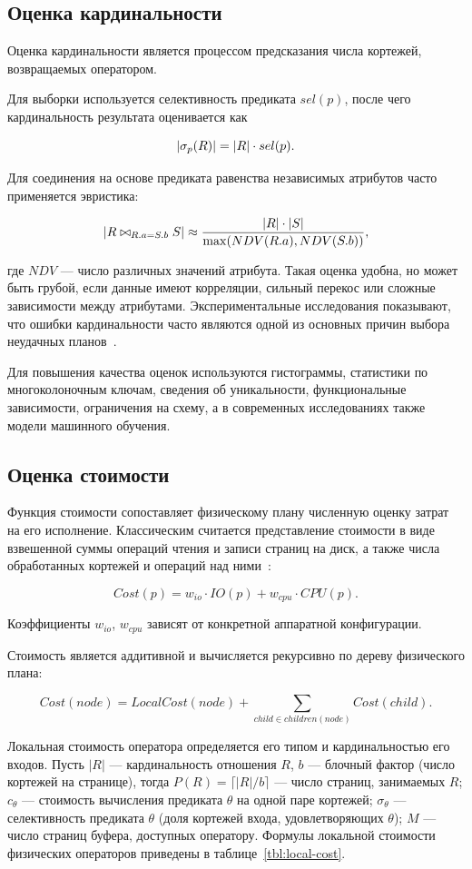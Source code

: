 \documentclass[fontsize=14pt, russian]{scrartcl}
\begin{document}
\subsection{Оценка кардинальности}

Оценка кардинальности является процессом предсказания числа кортежей,
возвращаемых оператором.

Для выборки используется селективность предиката \(sel(p)\), после чего
кардинальность результата оценивается как

\[
    |\sigma_{p}(R)| = |R| \cdot sel(p).
\]

Для соединения на основе предиката равенства независимых атрибутов часто
применяется эвристика:

\[
    |R \bowtie_{R.a = S.b} S| \approx
    \frac{|R| \cdot |S|}{\max(NDV(R.a), NDV(S.b))},
\]

где \(NDV\) --- число различных значений атрибута. Такая оценка удобна, но может
быть грубой, если данные имеют корреляции, сильный перекос или сложные
зависимости между атрибутами. Экспериментальные исследования показывают, что
ошибки кардинальности часто являются одной из основных причин выбора неудачных
планов~\cite{leis2015good}.

Для повышения качества оценок используются гистограммы, статистики по
многоколоночным ключам, сведения об уникальности, функциональные зависимости,
ограничения на схему, а в современных исследованиях также модели машинного
обучения.

\subsection{Оценка стоимости}

Функция стоимости сопоставляет физическому плану численную оценку затрат на его
исполнение. Классическим считается представление стоимости в виде взвешенной
суммы операций чтения и записи страниц на диск, а также числа обработанных
кортежей и операций над ними~\cite{GraefeMcKenna1993,Graefe1995}:

\[
    Cost(p) = w_{io} \cdot IO(p) + w_{cpu} \cdot CPU(p).
\]

Коэффициенты \(w_{io}\), \(w_{cpu}\) зависят от конкретной аппаратной
конфигурации.

Стоимость является аддитивной и вычисляется рекурсивно по дереву физического
плана:

\[
    Cost(node) = LocalCost(node) + \sum_{child \in children(node)} Cost(child).
\]

Локальная стоимость оператора определяется его типом и кардинальностью его
входов. Пусть \(|R|\) --- кардинальность отношения \(R\), \(b\) --- блочный
фактор (число кортежей на странице), тогда \(P(R) = \lceil|R|/b\rceil\) ---
число страниц, занимаемых \(R\); \(c_\theta\) --- стоимость вычисления
предиката \(\theta\) на одной паре кортежей; \(\sigma_\theta\) ---
селективность предиката \(\theta\) (доля кортежей входа, удовлетворяющих
\(\theta\)); \(M\) --- число страниц буфера, доступных оператору. Формулы
локальной стоимости физических операторов приведены в
таблице~\ref{tbl:local-cost}.
\end{document}
